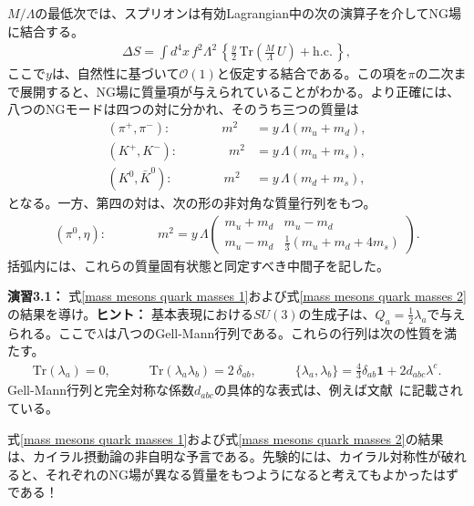 $M/\Lambda$の最低次では、スプリオンは有効Lagrangian中の次の演算子を介してNG場に結合する。
%
\begin{align} \label{CPT breaking mass}
	\Delta S = \int d^4 x \, f^2 \Lambda^2 \, \left\{ \frac{y}{2} \, \mbox{Tr} \left( \frac{M}{\Lambda} \, U \right) + \mbox{h.c.} \,\right\} , 
\end{align}
%
ここで$y$は、自然性に基づいて$\mathcal{O}(1)$と仮定する結合である。この項を$\pi$の二次まで展開すると、NG場に質量項が与えられていることがわかる。より正確には、八つのNGモードは四つの対に分かれ、そのうち三つの質量は
%
\begin{subequations}\label{mass mesons quark masses 1}
\begin{align} 
	(\pi^+, \pi^-): \qquad \qquad  m^2 &= y \, \Lambda (m_u+m_d), \\
    (K^+, K^-): \qquad \qquad m^2 &= y \, \Lambda (m_u+m_s), \\
    (K^0, \bar K^0): \qquad \qquad m^2 &= y \, \Lambda (m_d+m_s),
\end{align}
\end{subequations}
%
となる。一方、第四の対は、次の形の非対角な質量行列をもつ。
%
\begin{align} \label{mass mesons quark masses 2}
	(\pi^0, \eta): \qquad \qquad m^2 = y \, \Lambda \begin{pmatrix}
		m_u +m_d & m_u-m_d \\
		m_u-m_d & \tfrac{1}{3}(m_u+m_d +4m_s)                                 
	\end{pmatrix} . 
\end{align}
%
括弧内には、これらの質量固有状態と同定すべき中間子を記した。
%
\begin{eBox}
%
{\bf 演習3.1：} 式\eqref{mass mesons quark masses 1}および式\eqref{mass mesons quark masses 2}の結果を導け。{\bf ヒント：} 基本表現における$SU(3)$の生成子は、$Q_a = \tfrac{1}{2} \lambda_a$で与えられる。ここで$\lambda$は八つのGell-Mann行列である。これらの行列は次の性質を満たす。
%
\begin{align}
	\mbox{Tr} (\lambda_a) = 0, \qquad \quad \mbox{Tr} (\lambda_a \lambda_b) = 2 \, \delta_{ab}, \qquad \quad \{\lambda_a, \lambda_b\} =\tfrac{4}{3} \delta_{ab} \mathbf{1} + 2 d_{abc} \lambda^c . 
\end{align}
%
Gell-Mann行列と完全対称な係数$d_{abc}$の具体的な表式は、例えば文献~\cite{Scherer:2002tk}に記載されている。
%
\end{eBox}
%
式\eqref{mass mesons quark masses 1}および式\eqref{mass mesons quark masses 2}の結果は、カイラル摂動論の非自明な予言である。先験的には、カイラル対称性が破れると、それぞれのNG場が異なる質量をもつようになると考えてもよかったはずである！

